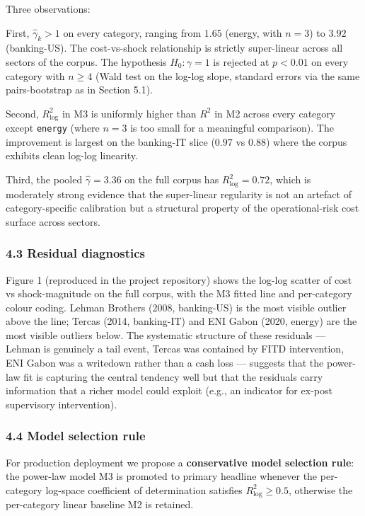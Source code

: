 \documentclass[
]{article}
\begin{document}
Three observations:

First, \(\hat{\gamma}_k > 1\) on every category, ranging from \(1.65\)
(energy, with \(n=3\)) to \(3.92\) (banking-US). The cost-vs-shock
relationship is strictly super-linear across all sectors of the corpus.
The hypothesis \(H_0: \gamma = 1\) is rejected at \(p < 0.01\) on every
category with \(n \geq 4\) (Wald test on the log-log slope, standard
errors via the same pairs-bootstrap as in Section 5.1).

Second, \(R^2_{\log}\) in M3 is uniformly higher than \(R^2\) in M2
across every category except \texttt{energy} (where \(n=3\) is too small
for a meaningful comparison). The improvement is largest on the
banking-IT slice (\(0.97\) vs \(0.88\)) where the corpus exhibits clean
log-log linearity.

Third, the pooled \(\hat{\gamma} = 3.36\) on the full corpus has
\(R^2_{\log} = 0.72\), which is moderately strong evidence that the
super-linear regularity is not an artefact of category-specific
calibration but a structural property of the operational-risk cost
surface across sectors.

\subsubsection{4.3 Residual diagnostics}\label{residual-diagnostics}

Figure 1 (reproduced in the project repository) shows the log-log
scatter of cost vs shock-magnitude on the full corpus, with the M3
fitted line and per-category colour coding. Lehman Brothers (2008,
banking-US) is the most visible outlier above the line; Tercas (2014,
banking-IT) and ENI Gabon (2020, energy) are the most visible outliers
below. The systematic structure of these residuals --- Lehman is
genuinely a tail event, Tercas was contained by FITD intervention, ENI
Gabon was a writedown rather than a cash loss --- suggests that the
power-law fit is capturing the central tendency well but that the
residuals carry information that a richer model could exploit (e.g., an
indicator for ex-post supervisory intervention).

\subsubsection{4.4 Model selection rule}\label{model-selection-rule}

For production deployment we propose a \textbf{conservative model
selection rule}: the power-law model M3 is promoted to primary headline
whenever the per-category log-space coefficient of determination
satisfies \(R^2_{\log} \geq 0.5\), otherwise the per-category linear
baseline M2 is retained.
\end{document}
